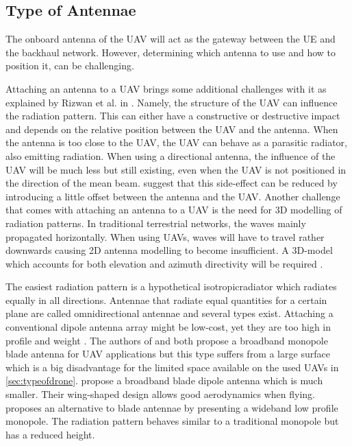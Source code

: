 \subsection{Type of Antennae} %

The onboard antenna of the \gls{UAV} will act as the gateway between the \gls{UE} and the backhaul network.
However, determining which antenna to use and how to position it, can be challenging.

Attaching an antenna to a \gls{UAV} brings some additional challenges with it as explained by Rizwan et al. in \cite{A1}.
Namely, the structure of the \gls{UAV} can influence the radiation pattern.  
This can either have a constructive or destructive impact and depends on the relative position between the \gls{UAV} and
the antenna.
When the antenna is too close to the \gls{UAV}, the \gls{UAV} can behave as a parasitic radiator, also emitting radiation.
When using a directional antenna, the influence of the \gls{UAV} will be much less but still existing, even when the \gls{UAV} is not 
positioned in the direction of the mean beam. \cite{A1} suggest that this side-effect can be reduced by introducing a little offset 
between the antenna and the \gls{UAV}.
Another challenge that comes with attaching an antenna to a \gls{UAV} is the need for 3D modelling of radiation patterns.
In traditional terrestrial networks,
the waves mainly propagated horizontally. When using \gls{UAV}s, waves will have to travel rather downwards 
causing 2D antenna modelling to become insufficient. A 3D-model which accounts for both elevation and azimuth directivity 
will be required \cite{U12}.

The easiest radiation pattern is a hypothetical  \gls{isotropicradiator} which radiates equally in all directions.
Antennae that radiate equal quantities for a certain plane  are called omnidirectional antennae \cite{U12} and several types 
exist.
Attaching a conventional dipole antenna array might be low-cost, yet they are too high in profile and weight \cite{A6}.
The authors of \cite{A9} and \cite{A11} both propose a broadband monopole blade antenna for \gls{UAV} applications 
but this type suffers from a large surface which is a big disadvantage for the limited space available on the used \gls{UAV}s in \ref{sec:typeofdrone}.
\cite{A10, A4} propose a broadband blade dipole antenna which is much smaller. Their wing-shaped design 
allows good aerodynamics when flying.
\cite{A12} proposes an alternative to blade 
antennae by presenting a wideband low profile monopole. The radiation pattern behaves similar to a traditional monopole but has 
a reduced height.

